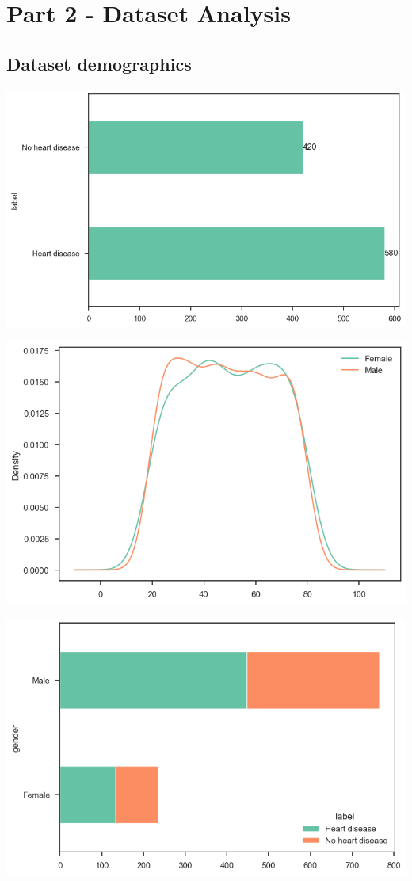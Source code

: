 \section{Part 2 - Dataset Analysis}

\subsection{Dataset demographics}

\includegraphics[width=0.8\linewidth]{media/demographics-01-target.png}

\includegraphics[width=0.8\linewidth]{media/demographics-02-gender-age.png}

\includegraphics[width=0.8\linewidth]{media/demographics-03-gender-target-count.png}


